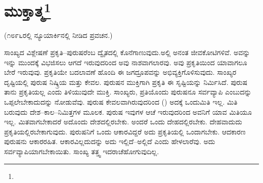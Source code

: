
\chapter[ಮುಕ್ತಾತ್ಮ]{ಮುಕ್ತಾತ್ಮ\protect\footnote{}}

\begin{center}
(೧೮೯೬ರಲ್ಲಿ ನ್ಯೂಯಾರ್ಕಿನಲ್ಲಿ ನೀಡಿದ ಪ್ರವಚನ.)
\end{center}

ಸಾಂಖ್ಯದ ವಿಶ್ಲೇಷಣೆ ಪ್ರಕೃತಿ–ಪುರುಷರೆಂಬ ದ್ವೈತದಲ್ಲಿ ಕೊನೆಗಾಣುವುದು.\break ಅಲ್ಲಿ ಅನಂತ ಜೀವಕೋಟಿಗಳಿವೆ. ಅವನ್ನು ಇನ್ನು ಮುಂದಕ್ಕೆ ವಿಭಜಿಸಲು ಆಗದೆ ಇರುವುದರಿಂದ ಅವು ನಾಶವಾಗಲಾರವು. ಅವು ಪ್ರಕೃತಿಯಿಂದ ಯಾವಾಗಲೂ ಬೇರೆ ಇರುವುವು. ಪ್ರಕೃತಿಯೇ ಬದಲಾವಣೆ ಹೊಂದಿ ಈ ಜಗದ್ರೂಪವನ್ನು ಅಭಿವ್ಯಕ್ತಿಗೊಳಿಸುವುದು. ಸಾಂಖ್ಯರ ದೃಷ್ಟಿಯಲ್ಲಿ ಪುರುಷ ನಿಷ್ಕ್ರಿಯ ಮತ್ತು ಕೇವಲ. ಪುರುಷನ ಮುಕ್ತಿಗಾಗಿ ಪ್ರಕೃತಿ ಈ ಸೃಷ್ಟಿಯನ್ನು ನಿರ್ಮಿಸಿದೆ. ಪುರುಷ ತಾನು ಪ್ರಕೃತಿಯಲ್ಲ ಎಂದು ತಿಳಿಯುವುದೇ ಮುಕ್ತಿ. ಸಾಂಖ್ಯರು, ಪ್ರತಿಯೊಂದು ಪುರುಷನೂ ಸರ್ವವ್ಯಾಪಿ ಎಂಬುದನ್ನು ಒಪ್ಪಲೇಬೇಕಾದುದನ್ನು ನೋಡುವೆವು. ಪುರುಷ ಕೇವಲವಾಗಿರುವುದರಿಂದ () ಅದಕ್ಕೆ ಒಂದು\break ಮಿತಿ ಇಲ್ಲ. ಮಿತಿ ಬರುವುದು ದೇಶ–ಕಾಲ–ನಿಮಿತ್ತಗಳ ಮೂಲಕ. ಪುರುಷ ಇವುಗಳ ಆಚೆ ಇರುವುದರಿಂದ ಅವನಿಗೆ ಯಾವ ಮಿತಿಯೂ ಇಲ್ಲ. ಮಿತವಾಗಬೇಕಾದರೆ ಅದೊಂದು ದೇಶದಲ್ಲಿರಬೇಕು. ಅಂದರೆ ಒಂದು ದೇಹದಲ್ಲಿರಬೇಕು. ದೇಹವಾದುದು ಪ್ರಕೃತಿಯಲ್ಲಿರಬೇಕಾಗುವುದು. ಪುರುಷನಿಗೆ ಒಂದು ಆಕಾರವಿದ್ದರೆ ಅದು ಪ್ರಕೃತಿಯಲ್ಲಿ ಒಂದಾಗಬೇಕು. ಆದಕಾರಣ ಪುರುಷನು ಆಕಾರರಹಿತ. ಆಕಾರವಿಲ್ಲದುದನ್ನು ಅದು ಇಲ್ಲಿದೆ–ಅಲ್ಲಿದೆ ಎಂದು ಹೇಳಲಾರೆವು. ಅದು ಸರ್ವವ್ಯಾಪಿಯಾಗಬೇಕಾಯಿತು. ಸಾಂಖ್ಯ ತತ್ತ್ವ ಇದರಾಚೆ\break ಹೋಗುವುದಿಲ್ಲ.

